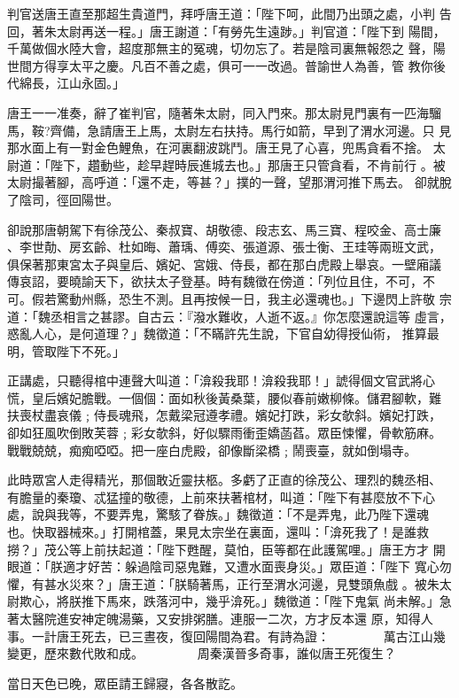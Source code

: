 \begin{pinyinscope}
{判官送唐王直至那超生貴道門，拜呼唐王道：「陛下呵，此間乃出頭之處，小判
告回，著朱太尉再送一程。」唐王謝道：「有勞先生遠踄。」判官道：「陛下到
陽間，千萬做個水陸大會，超度那無主的冤魂，切勿忘了。若是陰司裏無報怨之
聲，陽世間方得享太平之慶。凡百不善之處，俱可一一改過。普諭世人為善，管
教你後代綿長，江山永固。」

唐王一一准奏，辭了崔判官，隨著朱太尉，同入門來。那太尉見門裏有一匹海騮
馬，鞍?齊備，急請唐王上馬，太尉左右扶持。馬行如箭，早到了渭水河邊。只
見那水面上有一對金色鯉魚，在河裏翻波跳鬥。唐王見了心喜，兜馬貪看不捨。
太尉道：「陛下，趲動些，趁早趕時辰進城去也。」那唐王只管貪看，不肯前行
。被太尉撮著腳，高呼道：「還不走，等甚？」撲的一聲，望那渭河推下馬去。
卻就脫了陰司，徑回陽世。

卻說那唐朝駕下有徐茂公、秦叔寶、胡敬德、段志玄、馬三寶、程咬金、高士廉
、李世勣、房玄齡、杜如晦、蕭瑀、傅奕、張道源、張士衡、王珪等兩班文武，
俱保著那東宮太子與皇后、嬪妃、宮娥、侍長，都在那白虎殿上舉哀。一壁廂議
傳哀詔，要曉諭天下，欲扶太子登基。時有魏徵在傍道：「列位且住，不可，不
可。假若驚動州縣，恐生不測。且再按候一日，我主必還魂也。」下邊閃上許敬
宗道：「魏丞相言之甚謬。自古云：『潑水難收，人逝不返。』你怎麼還說這等
虛言，惑亂人心，是何道理？」魏徵道：「不瞞許先生說，下官自幼得授仙術，
推算最明，管取陛下不死。」

正講處，只聽得棺中連聲大叫道：「渰殺我耶！渰殺我耶！」諕得個文官武將心
慌，皇后嬪妃膽戰。一個個：面如秋後黃桑葉，腰似春前嫩柳條。儲君腳軟，難
扶喪杖盡哀儀﹔侍長魂飛，怎戴梁冠遵孝禮。嬪妃打跌，彩女欹斜。嬪妃打跌，
卻如狂風吹倒敗芙蓉﹔彩女欹斜，好似驟雨衝歪嬌菡萏。眾臣悚懼，骨軟筋麻。
戰戰兢兢，痴痴啞啞。把一座白虎殿，卻像斷梁橋﹔鬧喪臺，就如倒塌寺。

此時眾宮人走得精光，那個敢近靈扶柩。多虧了正直的徐茂公、理烈的魏丞相、
有膽量的秦瓊、忒猛撞的敬德，上前來扶著棺材，叫道：「陛下有甚麼放不下心
處，說與我等，不要弄鬼，驚駭了眷族。」魏徵道：「不是弄鬼，此乃陛下還魂
也。快取器械來。」打開棺蓋，果見太宗坐在裏面，還叫：「渰死我了！是誰救
撈？」茂公等上前扶起道：「陛下甦醒，莫怕，臣等都在此護駕哩。」唐王方才
開眼道：「朕適才好苦：躲過陰司惡鬼難，又遭水面喪身災。」眾臣道：「陛下
寬心勿懼，有甚水災來？」唐王道：「朕騎著馬，正行至渭水河邊，見雙頭魚戲
。被朱太尉欺心，將朕推下馬來，跌落河中，幾乎渰死。」魏徵道：「陛下鬼氣
尚未解。」急著太醫院進安神定魄湯藥，又安排粥膳。連服一二次，方才反本還
原，知得人事。一計唐王死去，已三晝夜，復回陽間為君。有詩為證：
　　　　萬古江山幾變更，歷來數代敗和成。
　　　　周秦漢晉多奇事，誰似唐王死復生？

當日天色已晚，眾臣請王歸寢，各各散訖。

}
\end{pinyinscope}
